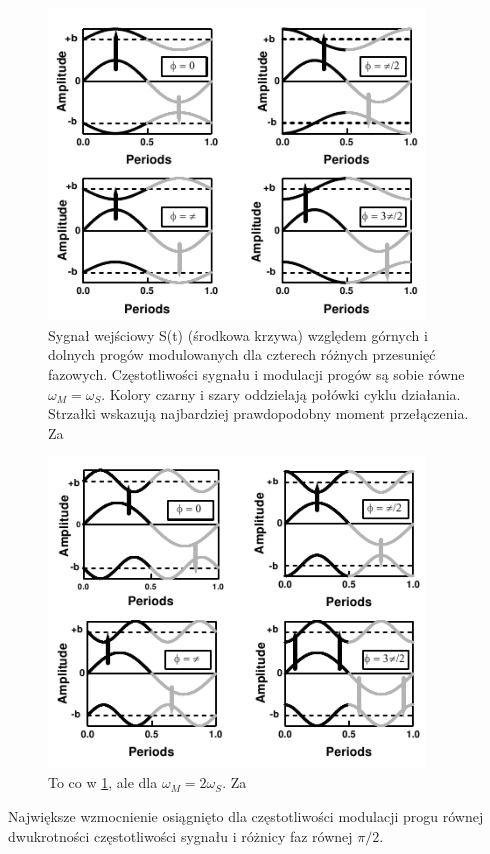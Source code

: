   \begin{figure}
    \includegraphics[width=100mm]{images/gammaitoni_1.png}
    \caption{Sygnał wejściowy S(t) (środkowa krzywa) względem górnych i dolnych progów modulowanych dla czterech różnych przesunięć fazowych. Częstotliwości sygnału i modulacji progów są sobie równe $\omega_M = \omega_S$. Kolory czarny i szary oddzielają połówki cyklu działania. Strzałki wskazują najbardziej prawdopodobny moment przełączenia. Za \cite{gammaitoni}}
    \label{fig:graphics:gammaitoni:fig1}
  \end{figure}

  \begin{figure}
    \includegraphics[width=100mm]{images/gammaitoni_2.png}
    \caption{To co w \ref{fig:graphics:gammaitoni:fig1}, ale dla $\omega_M = 2 \omega_S$. Za \cite{gammaitoni}}
    \label{fig:graphics:gammaitoni:fig2}
  \end{figure}

  Największe wzmocnienie osiągnięto dla częstotliwości modulacji progu równej dwukrotności częstotliwości sygnału i różnicy faz równej $\pi/2$.


